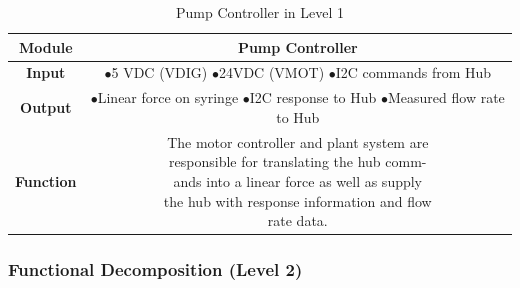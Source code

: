 \documentclass[journal]{IEEEtran}
\begin{document}
            \begin{table}[H]
            \renewcommand{\arraystretch}{1.3}
            \caption{Pump Controller in Level 1}
            \label{table:controller_level1}
                \begin{center}
                    \begin{tabular}{|c|c|}
                        \hline
                        \bfseries Module & Pump Controller \\ \hline
                        \bfseries Input & \makecell[l]{\(\bullet\)5 VDC (VDIG)\\
                                                       \(\bullet\)24VDC (VMOT)\\
                                                       \(\bullet\)I2C commands from Hub\\
                                                        }\\ \hline
                        \bfseries Output & \makecell[l]{\(\bullet\)Linear force on syringe\\
                                                       \(\bullet\)I2C response to Hub\\
                                                       \(\bullet\)Measured flow rate to               Hub\\}\\ \hline
                        \bfseries Function & \makecell[l]{The motor controller and plant system are\\
                                                          responsible for translating the hub comm-\\
                                                          ands into a linear force as well as supply\\
                                                          the hub with response information and flow\\        rate data. }\\ \hline
                    \end{tabular}
                \end{center}
            \end{table}
            
        \subsubsection{Functional Decomposition (Level 2)}
        
\end{document}
